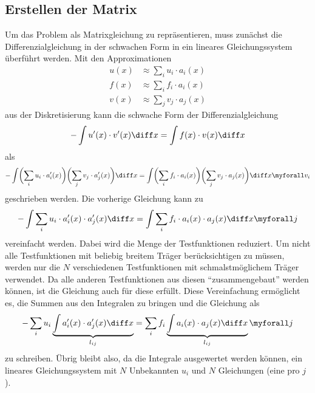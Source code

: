 \subsection{Erstellen der Matrix\label{fem:1d:matrix_erstellen}}
Um das Problem als Matrixgleichung zu repräsentieren, muss zunächst die Differenzialgleichung in der schwachen Form in ein lineares Gleichungssystem überführt werden.
Mit den Approximationen 
\begin{align}
    u(x) &\approx \sum_i u_i \cdot a_i(x) \\
    f(x) &\approx \sum_i f_i \cdot a_i(x) \\
    v(x) &\approx \sum_j v_j \cdot a_j(x)
\end{align}
aus der Diskretisierung kann die schwache Form der Differenzialgleichung 
\begin{equation}
    - \int u'(x) \cdot v'(x) \diff x = \int f(x) \cdot v(x) \diff x
\end{equation}
als
\begin{equation}
    - \int \biggl(\sum_i u_i \cdot a'_i(x)\biggr) \biggl(\sum_j v_j \cdot a'_j(x)\biggr) \diff x 
    = \int \biggl(\sum_i f_i \cdot a_i(x) \biggr) \biggl(\sum_j v_j \cdot a_j(x) \biggr) \diff x 
    \myforall v_i
\end{equation}
geschrieben werden.
Die vorherige Gleichung kann zu
\begin{equation}
    - \int \sum_i u_i \cdot a'_i(x) \cdot a'_j(x) \diff x = \int \sum_i f_i \cdot a_i(x) \cdot a_j(x) \diff x \myforall j
\end{equation}
vereinfacht werden.
Dabei wird die Menge der Testfunktionen reduziert.
Um nicht alle Testfunktionen mit beliebig breitem Träger berücksichtigen zu müssen, werden nur die $N$ verschiedenen Testfunktionen mit schmalstmöglichem Träger verwendet.
Da alle anderen Testfunktionen aus diesen ``zusammengebaut'' werden können, ist die Gleichung auch für diese erfüllt.
Diese Vereinfachung ermöglicht es, die Summen aus den Integralen zu bringen und die Gleichung als
\begin{equation}
    - \sum_i u_i \underbrace{\int a'_i(x) \cdot a'_j(x) \diff x}_{l_{ij}} = \sum_i f_i \underbrace{\int a_i(x) \cdot a_j(x) \diff x}_{l_{ij}} \myforall j \label{papers:fem:prinzip1d:finale_gleichung}
\end{equation}
zu schreiben.
Übrig bleibt also, da die Integrale ausgewertet werden können, ein lineares Gleichungssystem mit $N$ Unbekannten $u_i$ und $N$ Gleichungen (eine pro $j$). 

